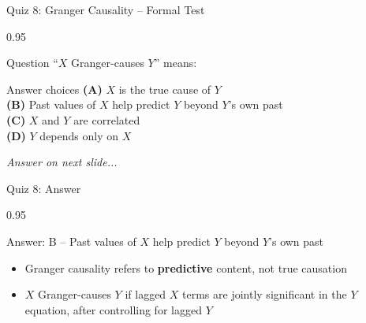 \documentclass[9pt, aspectratio=169, t]{beamer}
\begin{document}
\begin{frame}{Quiz 8: Granger Causality -- Formal Test}
    \begin{cminipage}{0.95\textwidth}
    \begin{alertblock}{Question}
        ``$X$ Granger-causes $Y$'' means:
    \end{alertblock}

    \vspace{0.4cm}

    \begin{block}{Answer choices}
        \textcolor{MainBlue}{\textbf{(A)}} $X$ is the true cause of $Y$\\[3pt]
        \textcolor{MainBlue}{\textbf{(B)}} Past values of $X$ help predict $Y$ beyond $Y$'s own past\\[3pt]
        \textcolor{MainBlue}{\textbf{(C)}} $X$ and $Y$ are correlated\\[3pt]
        \textcolor{MainBlue}{\textbf{(D)}} $Y$ depends only on $X$
    \end{block}

    \vspace{0.5cm}

    \begin{center}
        \textit{Answer on next slide...}
    \end{center}
    \end{cminipage}
\end{frame}

\begin{frame}{Quiz 8: Answer}
    \begin{cminipage}{0.95\textwidth}
    \begin{exampleblock}{Answer: B -- Past values of $X$ help predict $Y$ beyond $Y$'s own past}
        \begin{itemize}
            \item Granger causality refers to \textbf{predictive} content, not true causation
            \item $X$ Granger-causes $Y$ if lagged $X$ terms are jointly significant in the $Y$ equation, after controlling for lagged $Y$
        \end{itemize}
    \end{exampleblock}

    \end{cminipage}
\end{frame}
\end{document}
